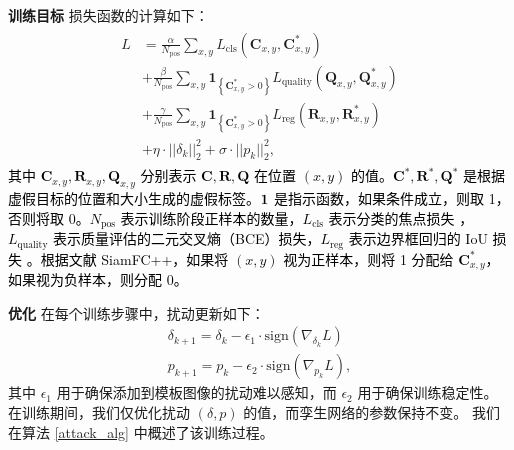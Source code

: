 \textbf{训练目标} 损失函数的计算如下：
\begin{equation}
\begin{array}{l}
\begin{aligned}
L&=\frac{\alpha}{N_{\mathrm{pos}}} \sum_{x, y} L_{\mathrm{cls}}\left(\textbf{C}_{x, y}, \textbf{C}_{x, y}^{*}\right) \\
&+\frac{\beta}{N_{\mathrm{pos}}} \sum_{x, y} \textbf{1}_{\left\{\textbf{C}_{x, y}^{*}>0\right\}} L_{\mathrm{quality}}\left(\textbf{Q}_{x, y}, \textbf{Q}_{x, y}^{*}\right) \\
&+\frac{\gamma}{N_{\mathrm{pos}}} \sum_{x, y} \textbf{1}_{\left\{\textbf{C}_{x, y}^{*}>0\right\}} L_{\mathrm{reg}}\left(\textbf{R}_{x, y}, \textbf{R}_{x, y}^{*}\right) \\
&+\eta \cdot ||\delta_k||_2^2 +  \sigma \cdot ||p_k||^2_2,
\end{aligned}
\end{array}
\label{eq:loss}
\end{equation}
\textcolor{black} %
{其中 $\textbf{C}_{x, y}, \textbf{R}_{x, y}, \textbf{Q}_{x, y}$ 分别表示 $\textbf{C}, \textbf{R}, \textbf{Q}$ 在位置 $(x, y)$ 的值。$\textbf{C}^*, \textbf{R}^*, \textbf{Q}^*$ 是根据虚假目标的位置和大小生成的虚假标签。$\textbf 1$ 是指示函数，如果条件成立，则取 1，否则将取 0。$N_{\mathrm{pos}}$ 表示训练阶段正样本的数量，$L_{\mathrm{cls}}$ 表示分类的焦点损失 \cite{focal}，$L_{\mathrm{quality}}$ 表示质量评估的二元交叉熵（BCE）损失，$L_{\mathrm{reg}}$ 表示边界框回归的 IoU 损失 \cite{iou-loss}。根据文献 SiamFC++，如果将 $(x, y)$ 视为正样本，则将 1 分配给 $\textbf{C}_{x, y}^{*}$，如果视为负样本，则分配 0。}

\textbf{优化} 在每个训练步骤中，扰动更新如下：
\begin{gather}
\delta_{k+1} = \delta_{k} - \epsilon_1 \cdot \text{sign}(\nabla_{\delta_k}L)\\
p_{k+1} = p_{k} - \epsilon_2 \cdot \text{sign}(\nabla_{p_k}L),
\end{gather}
其中 $\epsilon_1$ 用于确保添加到模板图像的扰动难以感知，而 $\epsilon_2$ 用于确保训练稳定性。
在训练期间，我们仅优化扰动 $(\delta, p)$ 的值，而孪生网络的参数保持不变。
我们在算法 \ref{attack_alg} 中概述了该训练过程。

